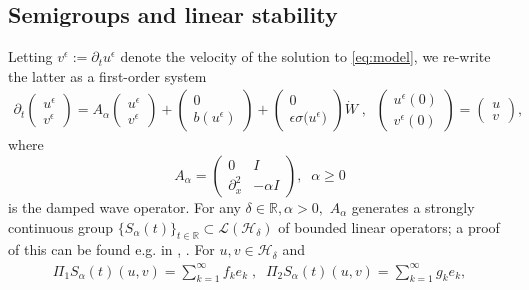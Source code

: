 \documentclass[10pt, reqno]{amsart}
\newcommand{\R}{\mathbb{R}}
\newcommand{\h}{\mathcal{H}}
\theoremstyle{definition}
\numberwithin{lem}{section}
\numberwithin{cor}{section}
\numberwithin{prop}{section}
\numberwithin{thm}{section}
\numberwithin{dfn}{section}
\begin{document}
 \subsection{Semigroups and linear stability} Letting $v^\epsilon:=\partial_tu^\epsilon$ denote the velocity of the solution to  \eqref{eq:model}, we re-write the latter as a first-order system 
 \begin{equation}\label{eq:modelsystem}
     \begin{aligned}
        \partial_t\begin{pmatrix}
		u^\epsilon \\v^\epsilon
	\end{pmatrix}=A_\alpha
		\begin{pmatrix}u^\epsilon \\v^\epsilon
	\end{pmatrix}+\begin{pmatrix}0\\b(u^\epsilon) \end{pmatrix}+\begin{pmatrix}0\\ \epsilon\sigma\big(u^{\epsilon}\big)\end{pmatrix} \dot{W}\;,\;\;\begin{pmatrix} u^\epsilon(0) \\v^\epsilon(0)\end{pmatrix}=\begin{pmatrix} u \\v
	\end{pmatrix},
     \end{aligned}
 \end{equation}
 where \begin{equation}\label{eq:dampedwavegenerator}
 	A_\alpha=\begin{pmatrix}
 		0&I\\
 		\partial_x^2& -\alpha I
 	\end{pmatrix},\;\;\alpha\geq 0
 \end{equation}
is the damped wave operator. For any $\delta\in\R,\alpha>0,$ $A_\alpha$ generates a strongly continuous group $\{S_\alpha(t)\}_{t\in\R}\subset\mathscr{L}(\h_\delta)$ of bounded linear operators; a proof of this can be found e.g. in \cite[Section 7.4]{pazy1983semigroups}, \cite[Proposition 2.4]{cerrai2006PTRFsmoluchowski1}. For $u,v\in\h_\delta$ and
\begin{equation*}
    \begin{aligned}
        \Pi_1S_\alpha(t)(u,v)=\sum_{k=1}^{\infty}f_ke_k\;,\;\;\Pi_2S_\alpha(t)(u,v)=\sum_{k=1}^{\infty}g_ke_k,
    \end{aligned}
\end{equation*}
\end{document}
